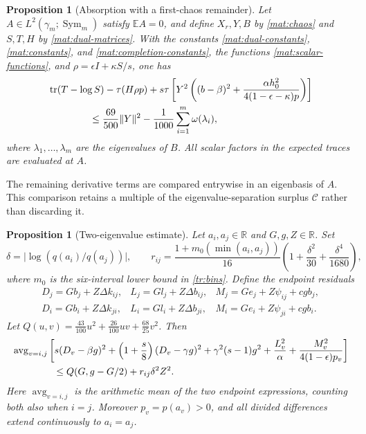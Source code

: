 \documentclass[11pt]{article}
\newtheorem{proposition}[theorem]{Proposition}
\theoremstyle{definition}
\theoremstyle{remark}
\numberwithin{equation}{section}
\begin{document}
\begin{proposition}[Absorption with a first-chaos remainder]
\label{mat:scalar-absorption}
Let $A\in L^2(\gamma_m;\operatorname{Sym}_m)$ satisfy $\mathbb E A=0$, and
define $X_r,Y,B$ by \eqref{mat:chaos} and $S,T,H$ by
\eqref{mat:dual-matrices}.  With the constants
\eqref{mat:dual-constants}, \eqref{mat:constants}, and
\eqref{mat:completion-constants}, the functions \eqref{mat:scalar-functions}, and
$\rho=\epsilon I+\kappa S/s$, one has
\begin{equation}\label{mat:absorption-inequality}
 \begin{split}
 &\operatorname{tr}(T-\log S)-\tau(H\rho p)
 +s\tau\left[Y^2\left((b-\beta)^2+
       \frac{\alpha h_0^2}{4(1-\epsilon-\kappa)p}\right)\right]\\
 &\hspace{15mm}\le\frac{69}{500}\|Y\|^2
       -\frac1{1000}\sum_{i=1}^m\omega(\lambda_i),
 \end{split}
\end{equation}
where $\lambda_1,\ldots,\lambda_m$ are the eigenvalues of $B$.
All scalar factors in the expected traces are evaluated at $A$.
\end{proposition}

The remaining derivative terms are compared entrywise in an eigenbasis
of $A$.  This comparison retains a multiple of the eigenvalue-separation
surplus $\mathcal C$ rather than discarding it.

\begin{proposition}[Two-eigenvalue estimate]\label{mat:scalar-pair}
Let $a_i,a_j\in\mathbb R$ and $G,g,Z\in\mathbb R$.  Set
\[
 \delta=\bigl|\log(q(a_i)/q(a_j))\bigr|,\qquad
 r_{ij}=\frac{1+m_0(\min(a_i,a_j))}{16}
       \left(1+\frac{\delta^2}{30}+\frac{\delta^4}{1680}\right),
\]
where $m_0$ is the six-interval lower bound in \eqref{tr:bins}.  Define the endpoint residuals
\[
 \begin{array}{lll}
 D_j=Gb_j+Z\Delta k_{ij},&L_j=Gl_j+Z\Delta b_{ij},&
 M_j=Ge_j+Z\psi_{ij}+cgb_j,\\
 D_i=Gb_i+Z\Delta k_{ji},&L_i=Gl_i+Z\Delta b_{ji},&
 M_i=Ge_i+Z\psi_{ji}+cgb_i.
 \end{array}
\]
Let
$Q(u,v)=\frac{43}{100}u^2+\frac{26}{100}uv+\frac{68}{25}v^2$.
Then
\begin{align}
 &\operatorname{avg}_{v=i,j}\left[
 s(D_v-\beta g)^2+\left(1+\frac s8\right)(D_v-\gamma g)^2
 +\gamma^2(s-1)g^2+\frac{L_v^2}{\alpha}
 +\frac{M_v^2}{4(1-\epsilon)p_v}\right]\notag\\
 &\hspace{15mm}\le Q(G,g-G/2)+r_{ij}\delta^2Z^2.
 \label{mat:pair-inequality}
\end{align}
Here $\operatorname{avg}_{v=i,j}$ is the arithmetic mean of the two
endpoint expressions, counting both also when $i=j$.  Moreover
$p_v=p(a_v)>0$, and all divided differences extend continuously to
$a_i=a_j$.
\end{proposition}
\end{document}
